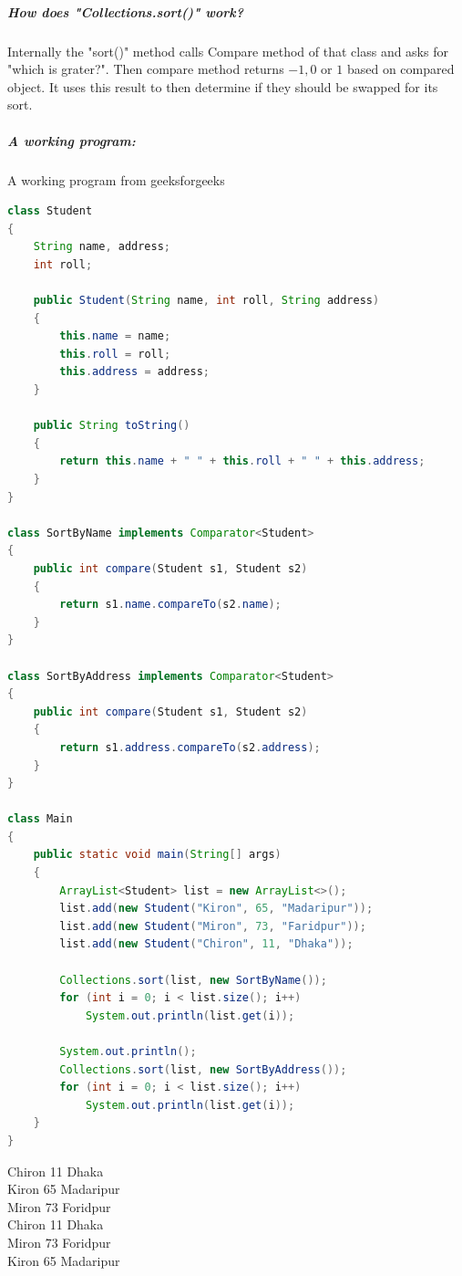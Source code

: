 \subparagraph{How does "Collections.sort()" work?}
Internally the "sort()" method calls Compare method of that class and asks for "which is grater?". Then compare method returns $-1, 0$ or $1$ based on compared object. It uses this result to then determine if they should be swapped for its sort.
\subparagraph{A working program:}
A working program from geeksforgeeks
\begin{lstlisting}[language = java, caption = Comparator for sorting Student class, backgroundcolor = \color{white}]
class Student
{
    String name, address;
    int roll;

    public Student(String name, int roll, String address)
    {
        this.name = name;
        this.roll = roll;
        this.address = address;
    }

    public String toString()
    {
        return this.name + " " + this.roll + " " + this.address;
    }
}

class SortByName implements Comparator<Student>
{
    public int compare(Student s1, Student s2)
    {
        return s1.name.compareTo(s2.name);
    }
}

class SortByAddress implements Comparator<Student>
{
    public int compare(Student s1, Student s2)
    {
        return s1.address.compareTo(s2.address);
    }
}

class Main
{
    public static void main(String[] args)
    {
        ArrayList<Student> list = new ArrayList<>();
        list.add(new Student("Kiron", 65, "Madaripur"));
        list.add(new Student("Miron", 73, "Faridpur"));
        list.add(new Student("Chiron", 11, "Dhaka"));

        Collections.sort(list, new SortByName());
        for (int i = 0; i < list.size(); i++)
            System.out.println(list.get(i));

        System.out.println();
        Collections.sort(list, new SortByAddress());
        for (int i = 0; i < list.size(); i++)
            System.out.println(list.get(i));
    }
}
\end{lstlisting}

\begin{tcolorbox}[enhanced, title = Output, attach boxed title to top left, width = 5 cm]
	Chiron 11 Dhaka\\
	Kiron 65 Madaripur\\
	Miron 73 Foridpur\\
\vspace{2.5 mm}
	Chiron 11 Dhaka\\
	Miron 73 Foridpur\\
	Kiron 65 Madaripur\\
\end{tcolorbox}

